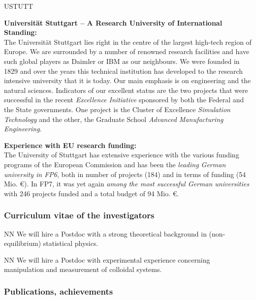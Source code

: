 \begin{sitedescription}{USTUTT} \label{desc:USTUTT}

{\bf Universität Stuttgart -- A Research University of International Standing:}\\
The Universität Stuttgart lies right in the centre of the largest high-tech region of Europe. We are surrounded by a number of renowned research facilities and have such global players as Daimler or IBM as our neighbours. We were founded in 1829 and over the years this technical institution has developed to the research intensive university that it is today. Our main emphasis is on engineering and the natural sciences.
%
Indicators of our excellent status are the two projects that were successful in the recent {\it Excellence Initiative} sponsored by both the Federal and the State governments. One project is the Cluster of Excellence {\it Simulation Technology} and the other, the Graduate School {\it Advanced Manufacturing Engineering}.

{\bf Experience with EU research funding:}\\
The University of Stuttgart has extensive experience with the various funding programs of the European Commission and has been the {\it leading German university in FP6}, both in number of projects (184) and in terms of funding (54 Mio. \euro). In FP7, it was yet again {\it among the most successful German universities} with 246 projects funded and a total budget of 94 Mio. \euro.

\subsubsection*{Curriculum vitae of the investigators}




\begin{participant}[type=res,PM=48,salary=5500]{NN}
We will hire a Postdoc with a strong theoretical background in (non-equilibrium) statistical
physics.
\end{participant}
\begin{participant}[type=res,PM=36,salary=5500]{NN}
We will hire a Postdoc with experimental experience concerning manipulation and measurement
of colloidal systems.
\end{participant}

\subsubsection*{Publications, achievements}


\end{sitedescription}
